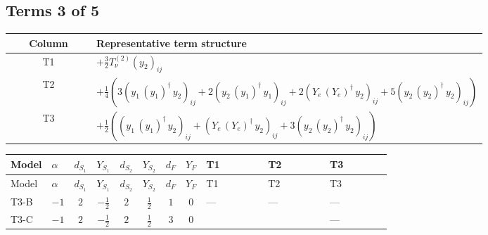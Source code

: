 \documentclass[8pt]{article}
\begin{document}
\begin{landscape}
\subsection*{Terms 3 of 5}
\begin{center}
\begin{tabular}{@{}c >{\raggedright\arraybackslash}p{0.82\linewidth}@{}}
\toprule
Column & Representative term structure \\
\midrule
T1 & \(\displaystyle +\frac{3}{2} T_{\nu}^{(2)} \left({y_2}\right)_{ij}\) \\
\midrule
T2 & \(\displaystyle +\frac{1}{4} (3 \left({y_1}\,\left({y_1}\right)^{\dagger}\,{y_2}\right)_{ij}+2 \left({y_2}\,\left({y_1}\right)^{\dagger}\,{y_1}\right)_{ij}+2 \left({Y_e}\,\left({Y_e}\right)^{\dagger}\,{y_2}\right)_{ij}+5 \left({y_2}\,\left({y_2}\right)^{\dagger}\,{y_2}\right)_{ij})\) \\
\midrule
T3 & \(\displaystyle +\frac{1}{2} (\left({y_1}\,\left({y_1}\right)^{\dagger}\,{y_2}\right)_{ij}+\left({Y_e}\,\left({Y_e}\right)^{\dagger}\,{y_2}\right)_{ij}+3 \left({y_2}\,\left({y_2}\right)^{\dagger}\,{y_2}\right)_{ij})\) \\
\midrule
\bottomrule
\end{tabular}
\end{center}
\smallskip
\tiny
\begin{longtable}{@{}llcccccc >{\raggedright\arraybackslash}p{0.21\linewidth} >{\raggedright\arraybackslash}p{0.21\linewidth} >{\raggedright\arraybackslash}p{0.21\linewidth}@{}}
\toprule
Model & $\alpha$ & $d_{S_1}$ & $Y_{S_1}$ & $d_{S_2}$ & $Y_{S_2}$ & $d_F$ & $Y_F$ & T1 & T2 & T3 \\
\midrule
\endfirsthead
\toprule
Model & $\alpha$ & $d_{S_1}$ & $Y_{S_1}$ & $d_{S_2}$ & $Y_{S_2}$ & $d_F$ & $Y_F$ & T1 & T2 & T3 \\
\midrule
\endhead
T3-B & $-1$ & $2$ & $-\frac{1}{2}$ & $2$ & $\frac{1}{2}$ & $1$ & $0$ & --- & --- & --- \\
\midrule
T3-C & $-1$ & $2$ & $-\frac{1}{2}$ & $2$ & $\frac{1}{2}$ & $3$ & $0$ & \scriptsize\adjustbox{max width=\linewidth}{$\begin{gathered} +\frac{3}{2} T_{\nu}^{(2)} \left({y_2}\right)_{ij}\end{gathered}$} & \scriptsize\adjustbox{max width=\linewidth}{$\begin{gathered} +\frac{1}{4} (3 \left({y_1}\,\left({y_1}\right)^{\dagger}\,{y_2}\right)_{ij}+2 \left({y_2}\,\left({y_1}\right)^{\dagger}\,{y_1}\right)_{ij}+2 \left({Y_e}\,\left({Y_e}\right)^{\dagger}\,{y_2}\right)_{ij}+5 \left({y_2}\,\left({y_2}\right)^{\dagger}\,{y_2}\right)_{ij})\end{gathered}$} & --- \\

\end{longtable}
\end{landscape}
\end{document}
